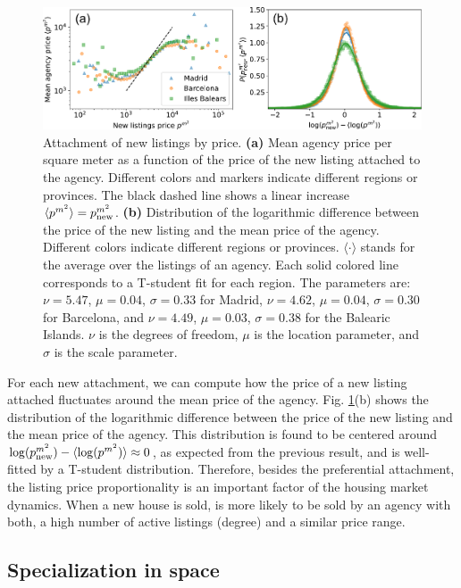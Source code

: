 \begin{figure}
    \centering
    \includegraphics[width =\textwidth]{Figs/Idealista_dynamics/panel_attach_price.pdf}
	\caption[Attachment dynamics of new listings by price.]{Attachment of new listings by price. \textbf{(a)} Mean agency price per square meter as a function of the price of the new listing attached to the agency. Different colors and markers indicate different regions or provinces. The black dashed line shows a linear increase $\langle p^{{m}^2} \rangle = p^{{m}^2}_{\rm new}$. \textbf{(b)} Distribution of the logarithmic difference between the price of the new listing and the mean price of the agency. Different colors indicate different regions or provinces. $\langle \cdot \rangle$ stands for the average over the listings of an agency. Each solid colored line corresponds to a T-student fit for each region. The parameters are: $\nu = 5.47$, $\mu = 0.04$, $\sigma = 0.33$ for Madrid, $\nu = 4.62$, $\mu = 0.04$, $\sigma = 0.30$ for Barcelona, and $\nu = 4.49$, $\mu = 0.03$, $\sigma = 0.38$ for the Balearic Islands. $\nu$ is the degrees of freedom, $\mu$ is the location parameter, and $\sigma$ is the scale parameter. \label{fig:attach_price}}
\end{figure}

For each new attachment, we can compute how the price of a new listing attached fluctuates around the mean price of the agency. Fig. \ref{fig:attach_price}(b) shows the distribution of the logarithmic difference between the price of the new listing and the mean price of the agency. This distribution is found to be centered around $\log( p^{{m}^2}_{\rm new}) - \langle \log ( p^{{m}^2} ) \rangle \approx 0$, as expected from the previous result, and is well-fitted by a T-student distribution. Therefore, besides the preferential attachment, the listing price proportionality is an important factor of the housing market dynamics. When a new house is sold, is more likely to be sold by an agency with both, a high number of  active listings (degree) and a similar price range.

\subsection{Specialization in space}

